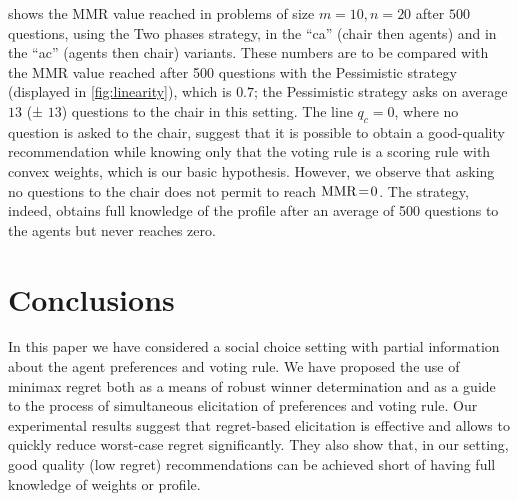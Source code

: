 \documentclass[runningheads]{llncs}
\theoremstyle{remark}
\begin{document}
 shows the MMR value reached in problems of size $m = 10, n = 20$ after $500$ questions, using the Two phases strategy, in the “ca” (chair then agents) and in the “ac” (agents then chair) variants. These numbers are to be compared with the MMR value reached after 500 questions with the Pessimistic strategy (displayed in \cref{fig:linearity}), which is $0.7$; the Pessimistic strategy asks on average $13$ (± $13$) questions to the chair in this setting. 
The line $q_c = 0$, where no question is asked to the chair, suggest that it is possible to obtain a good-quality recommendation while knowing only that the voting rule is a scoring rule with convex weights, which is our basic hypothesis. However, we observe that asking no questions to the chair does not permit to reach $\operatorname{MMR}\!=\!0$. The strategy, indeed, obtains full knowledge of the profile after an average of 500 questions to the agents but never reaches zero.

\section{Conclusions}  
\label{sec:conclusions}
In this paper we have considered a social choice setting with partial information about the agent preferences and voting rule.
We have proposed the use of minimax regret both as a means of robust winner determination and as a guide to the process of simultaneous elicitation of preferences and voting rule.
Our experimental results %
suggest that regret-based elicitation is effective and allows to quickly reduce worst-case regret significantly. They also show that, in our setting, good quality (low regret) recommendations can be achieved short of having full knowledge of weights or profile.
\end{document}
